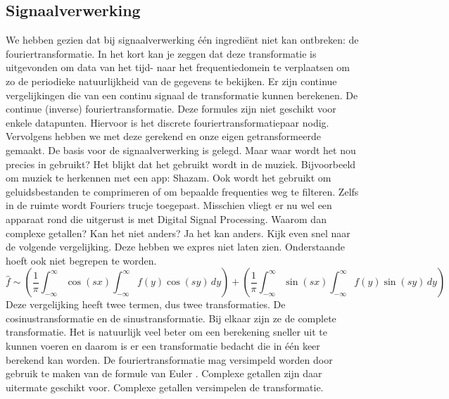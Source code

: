 \documentclass[11pt,fleqn]{book} %
\begin{document}
\subsection{Signaalverwerking}
We hebben gezien dat bij signaalverwerking één ingrediënt niet kan ontbreken: de fouriertransformatie. In het kort kan je zeggen dat deze transformatie is uitgevonden om data van het tijd- naar het frequentiedomein te verplaatsen om zo de periodieke natuurlijkheid van de gegevens te bekijken. Er zijn continue vergelijkingen die van een continu signaal de transformatie kunnen berekenen. De continue (inverse) fouriertransformatie. Deze formules zijn niet geschikt voor enkele datapunten. Hiervoor is het discrete fouriertransformatiepaar nodig. Vervolgens hebben we met deze gerekend en onze eigen getransformeerde gemaakt.
De basis voor de signaalverwerking is gelegd. Maar waar wordt het nou precies in gebruikt? Het blijkt dat het gebruikt wordt in de muziek. Bijvoorbeeld om muziek te herkennen met een app: Shazam. Ook wordt het gebruikt om geluidsbestanden te comprimeren of om bepaalde frequenties weg te filteren. Zelfs in de ruimte wordt Fouriers trucje toegepast. Misschien vliegt er nu wel een apparaat rond die uitgerust is met Digital Signal Processing.
Waarom dan complexe getallen? Kan het niet anders? Ja het kan anders. Kijk even snel naar de volgende vergelijking. Deze hebben we expres niet laten zien. Onderstaande hoeft ook niet begrepen te worden.
\begin{displaymath}
\hat{f}\sim\left(\frac{1}{\pi}\int_{-\infty}^\infty\cos{(sx)}\int_{-\infty}^\infty f(y)\cos{(sy)}\,dy\right)+\left(\frac{1}{\pi}\int_{-\infty}^\infty\sin{(sx)}\int_{-\infty}^\infty f(y)\sin{(sy)}\,dy\right)
\end{displaymath}
Deze vergelijking heeft twee termen, dus twee transformaties. De cosinustransformatie en de sinustransformatie. Bij elkaar zijn ze de complete transformatie. Het is natuurlijk veel beter om een berekening sneller uit te kunnen voeren en daarom is er een transformatie bedacht die in één keer berekend kan worden. De fouriertransformatie mag versimpeld worden door gebruik te maken van de formule van Euler \cite{jo}. Complexe getallen zijn daar uitermate geschikt voor. Complexe getallen versimpelen de transformatie.
\end{document}
